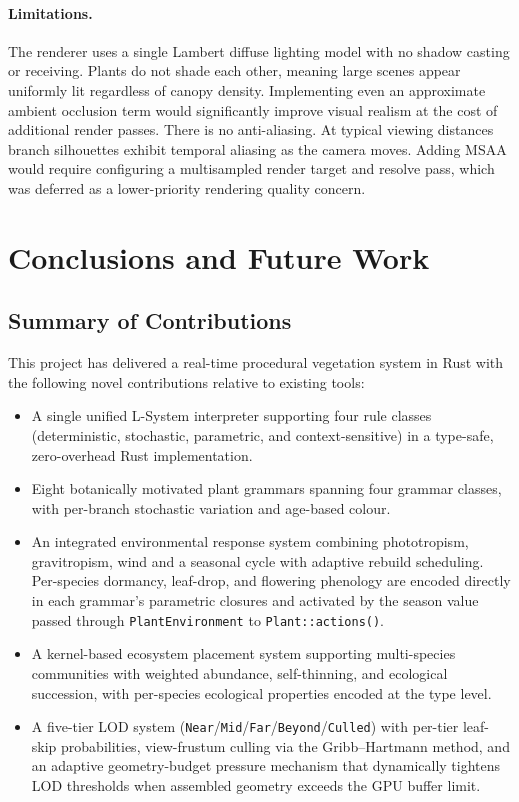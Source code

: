 \paragraph{Limitations.}
The renderer uses a single Lambert diffuse lighting model with no shadow casting or receiving. Plants do
not shade each other, meaning large scenes appear uniformly lit regardless of canopy density. Implementing
even an approximate ambient occlusion term would significantly improve visual realism at the cost of
additional render passes. There is no anti-aliasing. At typical viewing distances branch silhouettes exhibit
temporal aliasing as the camera moves. Adding MSAA would require configuring a multisampled render target and
resolve pass, which was deferred as a lower-priority rendering quality concern.

\section{Conclusions and Future Work}

\subsection{Summary of Contributions}

This project has delivered a real-time procedural vegetation system in Rust with the following novel
contributions relative to existing tools:

\begin{itemize}
  \item A single unified L-System interpreter supporting four rule classes (deterministic, stochastic,
    parametric, and context-sensitive) in a type-safe, zero-overhead Rust implementation.
  \item Eight botanically motivated plant grammars spanning four grammar classes, with per-branch stochastic
    variation and age-based colour.
  \item An integrated environmental response system combining phototropism, gravitropism, wind and a seasonal
    cycle with adaptive rebuild scheduling. Per-species dormancy, leaf-drop, and flowering phenology are
    encoded directly in each grammar's parametric closures and activated by the season value passed through
    \texttt{PlantEnvironment} to \texttt{Plant::actions()}.
  \item A kernel-based ecosystem placement system supporting multi-species communities with weighted
    abundance, self-thinning, and ecological succession, with per-species ecological properties encoded at
    the type level.
  \item A five-tier LOD system (\texttt{Near}/\texttt{Mid}/\texttt{Far}/\texttt{Beyond}/\texttt{Culled}) with
    per-tier leaf-skip probabilities, view-frustum culling via the Gribb--Hartmann method, and an adaptive
    geometry-budget pressure mechanism that dynamically tightens LOD thresholds when assembled geometry
    exceeds the GPU buffer limit.
\end{itemize}

